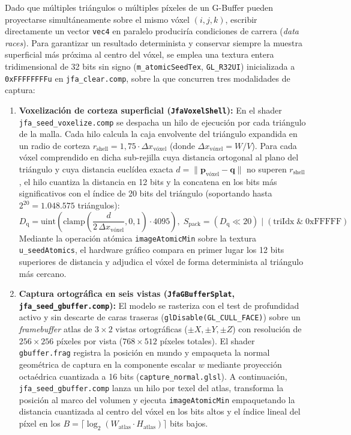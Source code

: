 Dado que múltiples triángulos o múltiples píxeles de un G-Buffer pueden proyectarse simultáneamente sobre el mismo vóxel $(i, j, k)$, escribir directamente un vector \texttt{vec4} en paralelo produciría condiciones de carrera (\textit{data races}). Para garantizar un resultado determinista y conservar siempre la muestra superficial más próxima al centro del vóxel, se emplea una textura entera tridimensional de 32 bits sin signo (\texttt{m\_atomicSeedTex}, \texttt{GL\_R32UI}) inicializada a \texttt{0xFFFFFFFFu} en \texttt{jfa\_clear.comp}, sobre la que concurren tres modalidades de captura:

\begin{enumerate}
  \item \textbf{Voxelización de corteza superficial (\texttt{JfaVoxelShell}):} En el shader \texttt{jfa\_seed\_voxelize.\allowbreak comp} se despacha un hilo de ejecución por cada triángulo de la malla. Cada hilo calcula la caja envolvente del triángulo expandida en un radio de corteza $r_{\text{shell}} = 1,75 \cdot \Delta x_{\text{vóxel}}$ (donde $\Delta x_{\text{vóxel}} = W / V$). Para cada vóxel comprendido en dicha sub-rejilla cuya distancia ortogonal al plano del triángulo y cuya distancia euclídea exacta $d = \|\mathbf{p}_{\text{vóxel}} - \mathbf{q}\|$ no superen $r_{\text{shell}}$, el hilo cuantiza la distancia en 12 bits y la concatena en los bits más significativos con el índice de 20 bits del triángulo (soportando hasta $2^{20} = 1.048.575$ triángulos):
  \begin{equation}
    D_{\text{q}} = \text{uint}\!\left(\text{clamp}\!\left(\frac{d}{2\,\Delta x_{\text{vóxel}}}, 0, 1\right) \cdot 4095\right), \; S_{\text{pack}} = (D_{\text{q}} \ll 20) \mid (\text{triIdx} \;\&\; \text{0xFFFFF})
  \end{equation}
  Mediante la operación atómica \texttt{imageAtomicMin} sobre la textura \texttt{u\_seedAtomics}, el hardware gráfico compara en primer lugar los 12 bits superiores de distancia y adjudica el vóxel de forma determinista al triángulo más cercano.
  \item \textbf{Captura ortográfica en seis vistas (\texttt{JfaGBufferSplat}, \texttt{jfa\_seed\_gbuffer.comp}):} El modelo se rasteriza con el test de profundidad activo y sin descarte de caras traseras (\texttt{glDisable(GL\_CULL\_FACE)}) sobre un \textit{framebuffer} atlas de $3 \times 2$ vistas ortográficas ($\pm X, \pm Y, \pm Z$) con resolución de $256 \times 256$ píxeles por vista ($768 \times 512$ píxeles totales). El shader \texttt{gbuffer.frag} registra la posición en mundo y empaqueta la normal geométrica de captura en la componente escalar $w$ mediante proyección octaédrica cuantizada a 16 bits (\texttt{capture\_normal.glsl}). A continuación, \texttt{jfa\_seed\_gbuffer.comp} lanza un hilo por texel del atlas, transforma la posición al marco del volumen y ejecuta \texttt{imageAtomicMin} empaquetando la distancia cuantizada al centro del vóxel en los bits altos y el índice lineal del píxel en los $B = \lceil\log_2(W_{\text{atlas}} \cdot H_{\text{atlas}})\rceil$ bits bajos.

\end{enumerate}

